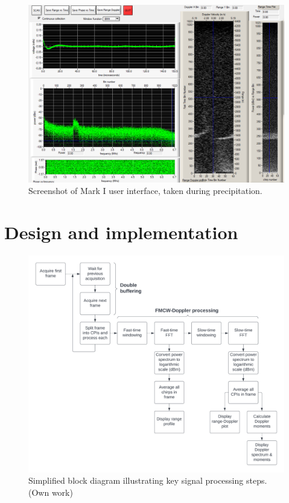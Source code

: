 \documentclass{article}
\begin{document}
\begin{figure}
	\centering
	\includegraphics[width=\textwidth]{mark-1-rain}
	\caption{Screenshot of Mark I user interface, taken during precipitation.}
	\label{fig:Mark1Rain}
\end{figure}

\section{Design and implementation}
\begin{figure}
	\centering
	\includegraphics[width=\textwidth]{signal-processing-diagram}
	\caption{Simplified block diagram illustrating key signal processing steps. (Own work)}
	\label{fig:SignalProcessingDiagram}
\end{figure}
\end{document}
